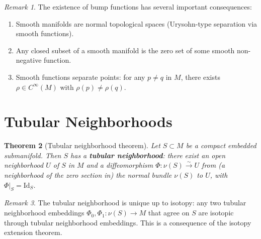 \documentclass[12pt,a4paper,openany]{book}
\newtheorem{theorem}{Theorem}[section]
\theoremstyle{definition}
\theoremstyle{remark}
\newtheorem{remark}[theorem]{Remark}
\newcommand{\Id}{\mathrm{Id}}
\begin{document}
\begin{remark}\label{rem:app-bump-consequences}
The existence of bump functions has several important consequences:
\begin{enumerate}[label=(\roman*)]
  \item Smooth manifolds are normal topological spaces (Urysohn-type
    separation via smooth functions).
  \item Any closed subset of a smooth manifold is the zero set of some
    smooth non-negative function.
  \item Smooth functions separate points: for any $p \neq q$ in $M$,
    there exists $\rho \in C^\infty(M)$ with $\rho(p) \neq \rho(q)$.
\end{enumerate}
\end{remark}

\section{Tubular Neighborhoods}\label{sec:app-tubular}

\begin{theorem}[Tubular neighborhood theorem]\label{thm:app-tubular}
Let $S \subset M$ be a compact embedded submanifold. Then $S$ has a
\textbf{tubular neighborhood}: there exist an open neighborhood $U$
of $S$ in $M$ and a diffeomorphism $\Phi\colon \nu(S) \xrightarrow{\sim} U$
from (a neighborhood of the zero section in) the normal bundle $\nu(S)$
to $U$, with $\Phi|_S = \Id_S$.
\end{theorem}

\begin{remark}\label{rem:tubular-uniqueness}
The tubular neighborhood is unique up to isotopy: any two tubular
neighborhood embeddings $\Phi_0,\Phi_1\colon \nu(S)\to M$ that agree
on $S$ are isotopic through tubular neighborhood embeddings.
This is a consequence of the isotopy extension theorem.
\end{remark}

\end{document}
